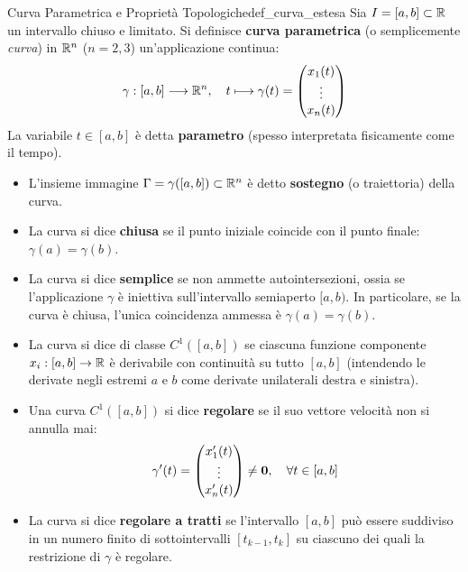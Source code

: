 \begin{definizione}{Curva Parametrica e Proprietà Topologiche}{def_curva_estesa}
Sia $I = [a,b] \subset \mathbb{R}$ un intervallo chiuso e limitato. Si definisce \textbf{curva parametrica} (o semplicemente \emph{curva}) in $\mathbb{R}^n$ ($n=2,3$) un'applicazione continua:
\[
\gamma: [a,b] \longrightarrow \mathbb{R}^n, \quad t \longmapsto \gamma(t) = \begin{pmatrix} x_1(t) \\ \vdots \\ x_n(t) \end{pmatrix}
\]
La variabile $t \in [a,b]$ è detta \textbf{parametro} (spesso interpretata fisicamente come il tempo).
\begin{itemize}
    \item L'insieme immagine $\Gamma = \gamma([a,b]) \subset \mathbb{R}^n$ è detto \textbf{sostegno} (o traiettoria) della curva.
    \item La curva si dice \textbf{chiusa} se il punto iniziale coincide con il punto finale: $\gamma(a) = \gamma(b)$.
    \item La curva si dice \textbf{semplice} se non ammette autointersezioni, ossia se l'applicazione $\gamma$ è iniettiva sull'intervallo semiaperto $[a,b)$. In particolare, se la curva è chiusa, l'unica coincidenza ammessa è $\gamma(a) = \gamma(b)$.
    \item La curva si dice di classe \textbf{$C^1([a,b])$} se ciascuna funzione componente $x_i: [a,b] \to \mathbb{R}$ è derivabile con continuità su tutto $[a,b]$ (intendendo le derivate negli estremi $a$ e $b$ come derivate unilaterali destra e sinistra).
    \item Una curva $C^1([a,b])$ si dice \textbf{regolare} se il suo vettore velocità non si annulla mai:
    \[
    \gamma'(t) = \begin{pmatrix} x_1'(t) \\ \vdots \\ x_n'(t) \end{pmatrix} \neq \mathbf{0}, \quad \forall t \in [a,b]
    \]
    \item La curva si dice \textbf{regolare a tratti} se l'intervallo $[a,b]$ può essere suddiviso in un numero finito di sottointervalli $[t_{k-1}, t_k]$ su ciascuno dei quali la restrizione di $\gamma$ è regolare.
\end{itemize}
\end{definizione}

